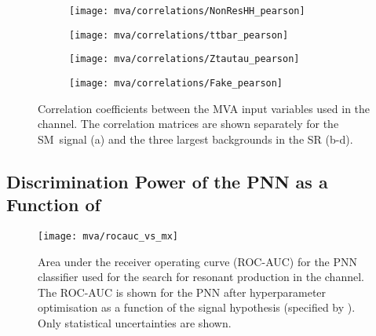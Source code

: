 \begin{figure}[htbp]
  \centering

  \begin{subfigure}[t]{.49\textwidth}
    \texttt{[image: mva/correlations/NonResHH\_pearson]}
  \end{subfigure}\hfill %
  \begin{subfigure}[t]{.49\textwidth}
    \texttt{[image: mva/correlations/ttbar\_pearson]}
  \end{subfigure}

  \begin{subfigure}[t]{.49\textwidth}
    \texttt{[image: mva/correlations/Ztautau\_pearson]}
  \end{subfigure}\hfill %
  \begin{subfigure}[t]{.49\textwidth}
    \texttt{[image: mva/correlations/Fake\_pearson]}
  \end{subfigure}

  \caption[Correlation coefficients between the MVA input variables used in the
  \hadhad channel.]{Correlation coefficients between the MVA input variables
    used in the \hadhad channel. The correlation matrices are shown separately
    for the SM~\HH signal (a) and the three largest backgrounds in the \hadhad
    SR (b-d).}%
  \label{fig:mva_input_correlations}
\end{figure}


\clearpage
\subsection{Discrimination Power of the PNN as a Function of \mX}%
\label{app:pnn_rocauc_vs_mx}

\begin{figure}[htbp]
  \centering

  \texttt{[image: mva/rocauc\_vs\_mx]}

  \caption{Area under the receiver operating curve (ROC-AUC) for the
    PNN classifier used for the search for resonant \HH production in
    the \hadhad channel. The ROC-AUC is shown for the PNN after
    hyperparameter optimisation as a function of the signal hypothesis
    (specified by \mX). Only statistical uncertainties are shown.}%
  \label{fig:pnn_rocauc_vs_mx}
\end{figure}


